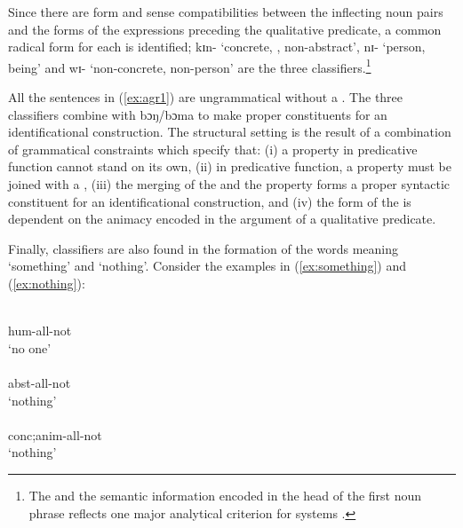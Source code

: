\begin{exe}
\begin{exe}
\begin{exe}
\begin{exe}
\begin{exe}
\begin{exe}
\begin{exe}
\begin{exe}
\begin{exe}
\begin{exe}
\begin{exe}

Since there are form and sense compatibilities between the inflecting noun pairs and the forms of the expressions preceding the qualitative predicate,  a common radical form for each is identified; {\sls kɪn}- { } `concrete, , non-abstract',  {\sls nɪ-} {\sc [hum] } `person,  being'  and  {\sls wɪ-} {\sc  [abst] } `non-concrete, non-person' are the three classifiers.\footnote{The   and the semantic information encoded in the head of the first noun phrase reflects one major analytical criterion for   systems \citep{Dixo86, Corb91, Grin00}.}

All the sentences in (\ref{ex:agr1}) are ungrammatical without a . The three classifiers  combine with {\sls bɔŋ}/{\sls bɔma}  to  make  proper constituents for an identificational construction. The structural setting  is the result of a combination of grammatical constraints which specify that: (i) a property in predicative function cannot stand on its own, (ii) in predicative function,  a property must be joined with a , (iii) the merging of the  and the property forms a proper syntactic constituent for an identificational construction, and (iv) the form of the  is dependent on the animacy encoded in the argument of a qualitative predicate. 

Finally,  classifiers are also found in the formation of the words meaning  `something' and `nothing'. Consider the examples in (\ref{ex:something}) and (\ref{ex:nothing}):

\ea\label{ex:nothing}

\ea\label{ex:nothingH}
\\
 {\sc hum}-all-not\\
\glt `no one'\\
\ex\label{ex:nothingC}
\\
 {\sc abst}-all-not\\
\glt `nothing'\\
\ex\label{ex:nothingA}
\\
 {\sc  conc;anim}-all-not\\
\glt `nothing'\\

\z
\z

% 
\ea\label{ex:something}
 


\end{exe}
\end{exe}
\end{exe}
\end{exe}
\end{exe}
\end{exe}
\end{exe}
\end{exe}
\end{exe}
\end{exe}
\end{exe}
